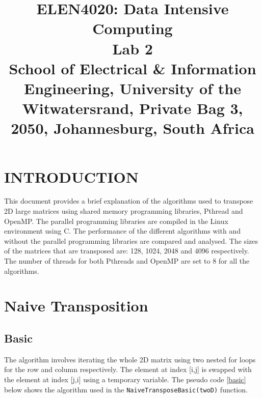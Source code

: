 \documentclass[conference]{IEEEtran}
\begin{document}
\title{ELEN4020: Data Intensive Computing\\ Lab 2\\
{\footnotesize School of Electrical \& Information Engineering, University of the
Witwatersrand, Private Bag 3, 2050, Johannesburg, South Africa}
}


\author{

\and
{}
\and
{}

}

\maketitle



\section{INTRODUCTION}
This document provides a brief explanation of the algorithms used to transpose 2D large matrices using shared memory programming libraries, Pthread and OpenMP. The parallel programming libraries are compiled in the Linux environment using C. The performance of the different algorithms with and without the parallel programming libraries are compared and analysed. The sizes of the matrices that are transposed are: 128, 1024, 2048 and 4096 respectively. The number of threads for both Pthreads and OpenMP are set to 8 for all the algorithms.

\section{Naive Transposition}

\subsection{Basic}
The algorithm involves iterating the whole 2D matrix using two nested for loops for the row and column respectively. The element at index [i,j] is swapped with the element at index [j,i] using a temporary variable. The pseudo code \ref{basic} below shows the algorithm used in the \texttt{NaiveTransposeBasic(twoD)} function.
\end{document}
